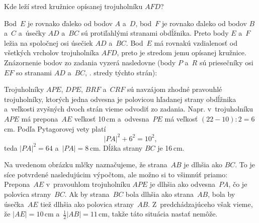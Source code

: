 {%
\napad
Kde leží stred kružnice opísanej trojuholníku $AFD$?

\riesenie
Bod~$E$ je rovnako ďaleko od bodov $A$ a~$D$, bod~$F$ je rovnako ďaleko od bodov $B$ a~$C$ a~úsečky $AD$ a~$BC$ sú protiľahlými stranami obdĺžnika.
Preto body $E$ a~$F$ ležia na spoločnej osi úsečiek $AD$ a~$BC$.
Bod~$E$ má rovnakú vzdialenosť od všetkých vrcholov trojuholníka $AFD$, preto je stredom jemu opísanej kružnice.
Znázornenie bodov zo zadania vyzerá nasledovne (body $P$ a~$R$ sú priesečníky osi~$EF$ so stranami $AD$ a~$BC$, \tj. stredy týchto strán):
%


Trojuholníky $APE$, $DPE$, $BRF$ a~$CRF$ sú navzájom zhodné pravouhlé trojuholníky, ktorých jedna odvesna je polovicou hľadanej strany obdĺžnika a~veľkosti zvyšných dvoch strán vieme odvodiť zo zadania.
Napr. v~trojuholníku $APE$ má prepona~$AE$ veľkosť 10\,cm a~odvesna~$PE$ má veľkosť $(22-10):2=6$\,cm.
Podľa Pytagorovej vety platí
$$
|PA|^2+6^2=10^2,
$$
teda $|PA|^2=64$ a~$|PA|=8$\,cm.
Dĺžka strany $BC$ je 16\,cm.

\poznamka
Na uvedenom obrázku mlčky naznačujeme, že strana~$AB$ je dlhšia ako $BC$.
To je síce potvrdené nasledujúcim výpočtom, ale možno si to všimnúť priamo:
Prepona~$AE$ v~pravouhlom trojuholníku $APE$ je dlhšia ako odvesna~$PA$, čo je polovica strany~$BC$.
Ak by strana~$BC$ bola dlhšia ako strana~$AB$, bola by úsečka~$AE$ tiež dlhšia ako polovica strany~$AB$.
Z~predchádzajúceho však vieme, že $|AE|=10$\,cm a~$\frac12|AB|=11$\,cm, takže táto situácia nastať nemôže.}

